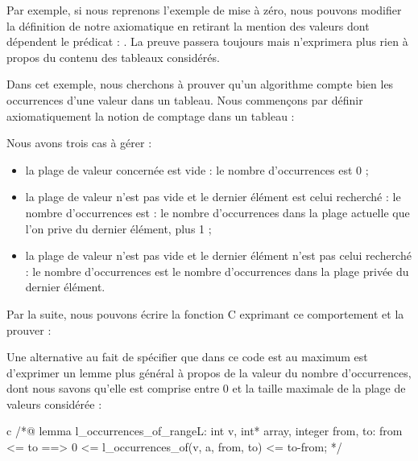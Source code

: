 Par exemple, si nous reprenons l'exemple de mise à zéro, nous pouvons modifier
la définition de notre axiomatique en retirant la mention des valeurs dont 
dépendent le prédicat : . La preuve passera toujours
mais n'exprimera plus rien à propos du contenu des tableaux considérés.





Dans cet exemple, nous cherchons à prouver qu'un algorithme compte bien les 
occurrences d'une valeur dans un tableau. Nous commençons par définir 
axiomatiquement la notion de comptage dans un tableau :





Nous avons trois cas à gérer :



\begin{itemize}
\item la plage de valeur concernée est vide : le nombre d'occurrences est 0 ;
\item la plage de valeur n'est pas vide et le dernier élément est celui recherché :
le nombre d'occurrences est : le nombre d'occurrences dans la plage actuelle que
l'on prive du dernier élément, plus 1 ;
\item la plage de valeur n'est pas vide et le dernier élément n'est pas celui 
recherché : le nombre d'occurrences est le nombre d'occurrences dans la plage
privée du dernier élément.
\end{itemize}


Par la suite, nous pouvons écrire la fonction C exprimant ce comportement et la
prouver :






Une alternative au fait de spécifier que dans ce code  est au 
maximum  est d'exprimer un lemme plus général à propos de la valeur
du nombre d'occurrences, dont nous savons qu'elle est comprise entre 0 et 
la taille maximale de la plage de valeurs considérée :



\begin{CodeBlock}{c}
/*@
lemma l_occurrences_of_range{L}:
  \forall int v, int* array, integer from, to:
    from <= to ==> 0 <= l_occurrences_of(v, a, from, to) <= to-from;
*/
\end{CodeBlock}



